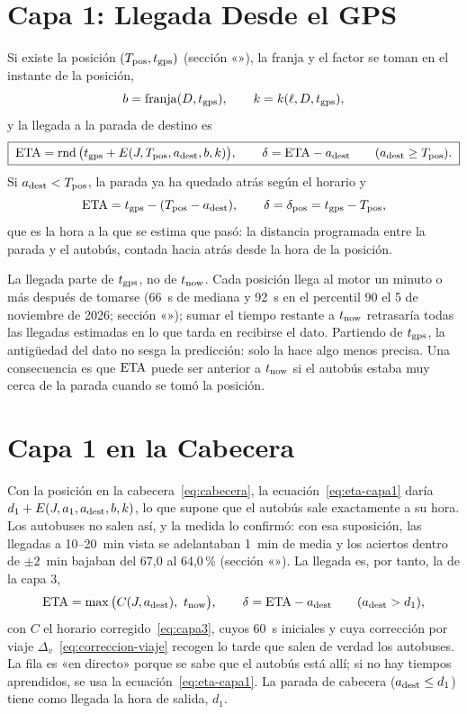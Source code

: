 \section{Capa 1: Llegada Desde el GPS}
\label{sec:capa1}

Si existe la posición $(T_{\mathrm{pos}},t_{\mathrm{gps}})$ (sección «»), la franja y el factor se toman en el
instante de la posición,
\[
b=\operatorname{franja}(D,t_{\mathrm{gps}}),\qquad k=k(\ell,D,t_{\mathrm{gps}}),
\]
y la llegada a la parada de destino es
\begin{equation}
\label{eq:eta-capa1}
\boxed{\;\mathrm{ETA}=\operatorname{rnd}\big(t_{\mathrm{gps}}+E(J,T_{\mathrm{pos}},a_{\mathrm{dest}},b,k)\big),\qquad \delta=\mathrm{ETA}-a_{\mathrm{dest}}\qquad(a_{\mathrm{dest}}\ge T_{\mathrm{pos}}).\;}
\end{equation}
Si $a_{\mathrm{dest}}<T_{\mathrm{pos}}$, la parada ya ha quedado atrás según el horario y
\begin{equation}
\label{eq:paso-capa1}
\mathrm{ETA}=t_{\mathrm{gps}}-(T_{\mathrm{pos}}-a_{\mathrm{dest}}),\qquad\delta=\delta_{\mathrm{pos}}=t_{\mathrm{gps}}-T_{\mathrm{pos}},
\end{equation}
que es la hora a la que se estima que pasó: la distancia programada entre la parada y el autobús, contada hacia atrás
desde la hora de la posición.

La llegada parte de $t_{\mathrm{gps}}$, no de $t_{\mathrm{now}}$. Cada posición llega al motor un minuto o más después de tomarse (66~s
de mediana y 92~s en el percentil 90 el 5 de noviembre de 2026; sección «»); sumar el tiempo
restante a $t_{\mathrm{now}}$ retrasaría todas las llegadas estimadas en lo que tarda en recibirse el dato. Partiendo de $t_{\mathrm{gps}}$, la antigüedad
del dato no sesga la predicción: solo la hace algo menos precisa. Una consecuencia es que $\mathrm{ETA}$ puede ser anterior a $t_{\mathrm{now}}$ si el autobús estaba muy cerca
de la parada cuando se tomó la posición.

\section{Capa 1 en la Cabecera}
\label{sec:cabecera-eta}

Con la posición en la cabecera~\eqref{eq:cabecera}, la ecuación~\eqref{eq:eta-capa1} daría $d_1+E(J,a_1,a_{\mathrm{dest}},b,k)$,
lo que supone que el autobús sale exactamente a su hora. Los autobuses no salen así, y la medida lo confirmó: con esa
suposición, las llegadas a 10--20~min vista se adelantaban 1~min de media y los aciertos dentro de $\pm2$~min bajaban
del 67{,}0 al 64{,}0\,\% (sección «»). La llegada es, por tanto, la de la capa 3,
\begin{equation}
\label{eq:eta-cabecera}
\mathrm{ETA}=\max\big(C(J,a_{\mathrm{dest}}),\ t_{\mathrm{now}}\big),\qquad \delta=\mathrm{ETA}-a_{\mathrm{dest}}\qquad(a_{\mathrm{dest}}>d_1),
\end{equation}
con $C$ el horario corregido~\eqref{eq:capa3}, cuyos 60~s iniciales y cuya corrección por viaje
$\Delta_v$~\eqref{eq:correccion-viaje} recogen lo tarde que salen de verdad los autobuses. La fila es «en directo»
porque se sabe que el autobús está allí; si no hay tiempos aprendidos, se usa la ecuación~\eqref{eq:eta-capa1}. La
parada de cabecera ($a_{\mathrm{dest}}\le d_1$) tiene como llegada la hora de salida, $d_1$.

